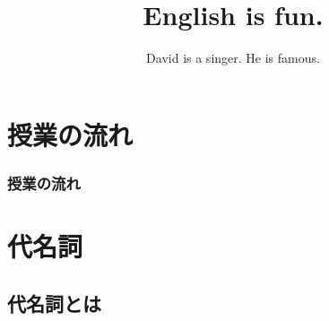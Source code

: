 \documentclass[aspectratio=169,xcolor={dvipsnames,table}]{beamer}
\title{English is fun.}
\subtitle{David is a singer. He is famous.}
\author{}
\institute[]{}
\date[]
\begin{document}
\begin{frame}[plain]
  \titlepage
\end{frame}

\section*{授業の流れ}
\begin{frame}[plain]
  \frametitle{授業の流れ}
  \tableofcontents
\end{frame}

\section{代名詞}
\subsection{代名詞とは}
\end{document}
